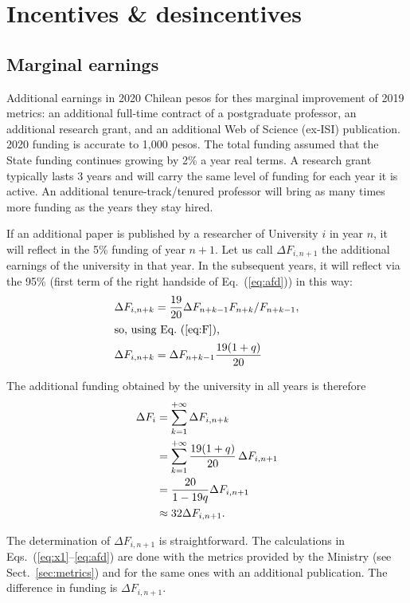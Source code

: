 \documentclass[twocolumn]{article}
\def\eqref#1{Eq.~(\ref{eq:#1})}
\def\eqsref#1#2{Eqs.~(\ref{eq:#1}--\ref{eq:#2})}
\begin{document}
\section{Incentives \& desincentives}
\subsection{Marginal earnings}
\label{tab:sciencecost}
\begin{table}[t]
\centering
\caption{Additional earnings in 2020 Chilean pesos for thes marginal improvement of 2019 metrics: an additional full-time contract of a postgraduate professor, an additional research grant, and an additional Web of Science (ex-ISI) publication.  2020 funding is accurate to 1,000 pesos. The total funding assumed that the State funding continues growing by 2\% a year real terms.  A research grant typically lasts 3 years and will carry the same level of funding for each year it is active.  An additional tenure-track/tenured professor will bring as many times more funding as the years they stay hired.}
\setlength\tabcolsep{5pt}

\end{table}

If an additional paper is published by a researcher of University $i$ in year $n$, it will reflect in the 5\% funding of year $n + 1$. Let us call $\Delta F_{i,n+1}$ the additional earnings 
of the university in that year.  In the subsequent years, it will reflect via the 95\% 
(first term of the right handside of \eqref{afd}) in this way:
\begin{align}
   \Delta F_{i,n+k} &=  \frac{19}{20} \Delta F_{n+k-1} F_{n+k}  / F_{n+k-1}, \notag\\
\intertext{so, using \eqref{F},}
   \Delta F_{i,n+k} &= \Delta F_{n+k-1}  \frac{ 19 (1 + q)} { 20}
\end{align}

The additional funding obtained by the university in all years is therefore
\begin{align}
    \Delta F_{i} &= \sum_{k=1}^{+\infty} \Delta F_{i,n+k} \notag \\
                 &= \sum_{k=1}^{+\infty} \frac{19(1 + q)}{20} \,\Delta F_{i,n+1} \notag \\
                 &= \frac{20} { 1 - 19q } \Delta F_{i,n+1}\\
                 &\approx 32 \Delta F_{i,n+1}. \notag
\end{align}

The determination of $\Delta F_{i,n+1}$ is straightforward.  The calculations
in \eqsref{x1}{afd} are done with the metrics provided by the Ministry (see Sect.~\ref{sec:metrics}) and for the same ones with an additional publication.  The difference in funding is $\Delta F_{i,n+1}$. 
\end{document}
